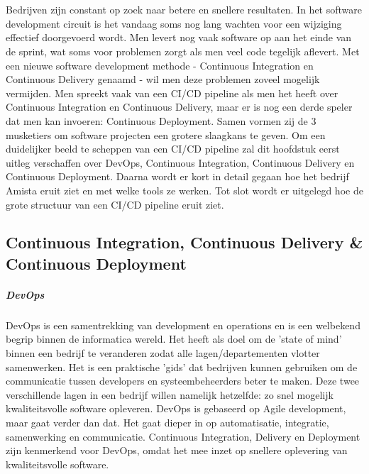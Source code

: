 \chapter{}
\label{ch:stand-van-zaken}

Bedrijven zijn constant op zoek naar betere en snellere resultaten. In het software development circuit is het vandaag soms nog lang wachten voor een wijziging effectief doorgevoerd wordt. Men levert nog vaak software op aan het einde van de sprint, wat soms voor problemen zorgt als men veel code tegelijk aflevert. Met een nieuwe software development methode - Continuous Integration en Continuous Delivery genaamd - wil men deze problemen zoveel mogelijk vermijden. Men spreekt vaak van een CI/CD pipeline als men het heeft over Continuous Integration en Continuous Delivery, maar er is nog een derde speler dat men kan invoeren: Continuous Deployment. Samen vormen zij de 3 musketiers om software projecten een grotere slaagkans te geven.
Om een duidelijker beeld te scheppen van een CI/CD pipeline zal dit hoofdstuk eerst uitleg verschaffen over DevOps, Continuous Integration, Continuous Delivery en Continuous Deployment. Daarna wordt er kort in detail gegaan hoe het bedrijf Amista eruit ziet en met welke tools ze werken. Tot slot wordt er uitgelegd hoe de grote structuur van een CI/CD pipeline eruit ziet.


\section{Continuous Integration, Continuous Delivery \& Continuous Deployment}
\label{sec:continuous-integration-continuous-delivery-continuous-deployment}
    \paragraph{DevOps}
    DevOps is een samentrekking van development en operations en is een welbekend begrip binnen de informatica wereld. Het heeft als doel om de 'state of mind' binnen een bedrijf te veranderen zodat alle lagen/departementen vlotter samenwerken. Het is een praktische 'gids' dat bedrijven kunnen gebruiken om de communicatie tussen developers en systeembeheerders beter te maken. Deze twee verschillende lagen in een bedrijf willen namelijk hetzelfde: zo snel mogelijk kwaliteitsvolle software opleveren. DevOps is gebaseerd op Agile development, maar gaat verder dan dat. Het gaat dieper in op automatisatie, integratie, samenwerking en communicatie. 
    Continuous Integration, Delivery en Deployment zijn kenmerkend voor DevOps, omdat het mee inzet op snellere oplevering van kwaliteitsvolle software. ~\autocite{Riti2018}
    

